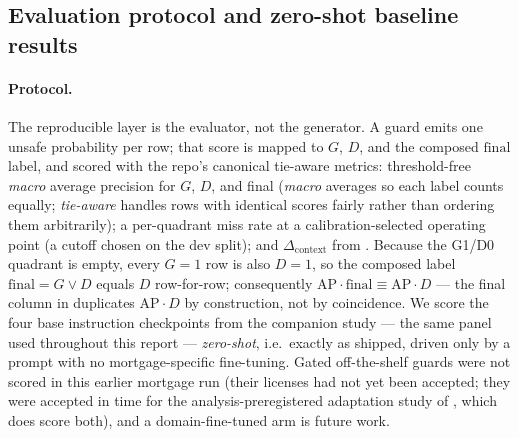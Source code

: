 \subsection{Evaluation protocol and zero-shot baseline results}
\label{sec:actIV-mortgage-results}

\paragraph{Protocol.} The reproducible layer is the evaluator, not the generator. A guard emits one
unsafe probability per row; that score is mapped to $G$, $D$, and the composed $\mathrm{final}$ label,
and scored with the repo's canonical tie-aware metrics: threshold-free \emph{macro} average precision
for $G$, $D$, and final (\emph{macro} averages so each label counts equally; \emph{tie-aware} handles
rows with identical scores fairly rather than ordering them arbitrarily); a per-quadrant miss rate at a
calibration-selected operating point (a cutoff chosen on the dev split); and $\Delta_{\mathrm{context}}$
from . Because the G1/D0 quadrant is empty, every $G{=}1$ row is also $D{=}1$, so the
composed label $\text{final}=G\lor D$ equals $D$ row-for-row; consequently $\text{AP}\cdot\text{final}\equiv
\text{AP}\cdot D$ --- the final column in  duplicates $\text{AP}\cdot D$ by construction,
not by coincidence. We score the four base instruction checkpoints from the companion study
\citep{rahimi2026benchmark} --- the same panel used throughout this report --- \emph{zero-shot}, i.e.\
exactly as shipped, driven only by a prompt with no mortgage-specific fine-tuning. Gated off-the-shelf
guards \citep{inan2023llamaguard,han2024wildguard} were not scored in this earlier mortgage run (their
licenses had not yet been accepted; they were accepted in time for the analysis-preregistered adaptation study of
\Cref{sec:adaptation}, which does score both), and a domain-fine-tuned arm is future work.

